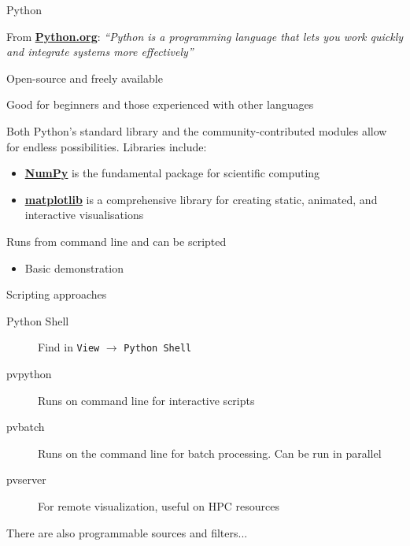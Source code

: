 \documentclass{beamer}
\begin{document}
\begin{frame}{Python}

From \href{https://www.python.org/}{\bf\underline{Python.org}}: \quad\emph{``Python is a programming language that lets you work quickly and integrate systems more effectively''}

\vskip 6pt

Open-source and freely available

\vskip 6pt

Good for beginners and those experienced with other languages

\vskip 6pt

Both Python's standard library and the community-contributed modules allow for endless possibilities. Libraries include:
\begin{itemize}
    \item \href{https://numpy.org/}{\bf\underline{NumPy}}  is the fundamental package for scientific computing
    \item \href{https://matplotlib.org/}{\bf\underline{matplotlib}} is a comprehensive library for creating static, animated, and interactive visualisations
\end{itemize}{}

\vskip 6pt

Runs from command line and can be scripted
\begin{itemize}
    \item Basic demonstration
\end{itemize}

\end{frame}{}


\begin{frame}{Scripting approaches}
    
    \begin{description}
        \item[Python Shell] Find in \texttt{View} $\rightarrow$ \texttt{Python Shell}
        \item[pvpython] Runs on command line for interactive scripts
        \item[pvbatch] Runs on the command line for batch processing. Can be run in parallel
        \item[pvserver] For remote visualization, useful on HPC resources
    \end{description}{}
    
    \vskip 6pt
    
    There are also programmable sources and filters...
    

\end{frame}{}
\end{document}
